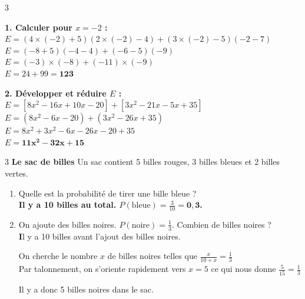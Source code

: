 \documentclass[a4paper]{book}
\begin{document}
{\begin{exerciceNote}{3}
        \medskip
        \begin{minipage}{0.5\linewidth}
            \textbf{1. Calculer pour $x = -2$ :} \\
            $E = (4 \times (-2)+5)(2 \times (-2)-4) + (3 \times (-2)-5)(-2-7)$ \\
            $E = (-8+5)(-4-4) + (-6-5)(-9)$ \\
            $E = (-3) \times (-8) + (-11) \times (-9)$ \\
            $E = 24 + 99 = \mathbf{123}$
        \end{minipage}
        \hfill
        \begin{minipage}{0.49\linewidth}
            \textbf{2. Développer et réduire $E$ :} \\
            $E = [8x^2 - 16x + 10x - 20] + [3x^2 - 21x - 5x + 35]$ \\
            $E = (8x^2 - 6x - 20) + (3x^2 - 26x + 35)$ \\
            $E = 8x^2 + 3x^2 - 6x - 26x - 20 + 35$ \\
            $E = \mathbf{11x^2 - 32x + 15}$
        \end{minipage}
    \end{exerciceNote}

    \begin{exerciceNote}{3}
        \textbf{Le sac de billes}
        Un sac contient 5 billes rouges, 3 billes bleues et 2 billes vertes.
        \begin{enumerate}
            \item Quelle est la probabilité de tirer une bille bleue ? \\
            \textbf{Il y a 10 billes au total. $P(\text{bleue}) = \frac{3}{10} = \mathbf{0,3}$.}
            \item On ajoute des billes noires. $P(\text{noire}) = \frac{1}{3}$. Combien de billes noires ? \\
            \textbf Il y a 10 billes avant l'ajout des billes noires.
            
            On cherche le nombre $x$ de billes noires telles que $\frac{x}{10+x}=\frac{1}{3}$\\
            Par talonnement, on s'oriente rapidement vers $x=5$ ce qui nous donne $\frac{5}{15}=\frac{1}{3}$

            Il y a donc 5 billes noires dans le sac.
            
        \end{enumerate}
    \end{exerciceNote}

}
\end{document}
